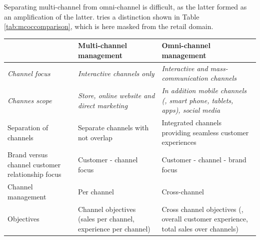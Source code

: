 		Separating multi-channel from omni-channel is difficult, as the latter formed as an amplification of the latter. \citeauthor{vorhoef2015retail} tries a distinction shown in Table \ref{tab:mcoccomparison}, which is here masked from the retail domain. 
		
		\begin{table}[caption={Multi- and omni-channel comparison}, label={tab:mcoccomparison}]
			\centering
			\begin{tabular}{p{3cm}| p{5cm} |p{5cm}} 
				& \textbf{Multi-channel management}                                   & \textbf{Omni-channel management}                                                              \\ \hline
				\textit{Channel focus}                         & \textit{Interactive channels only}                                    & \textit{Interactive and mass-communication channels}                                                   \\ \hline
				\textit{Channes scope}                                 & \textit{Store, online website and direct marketing}                          & \textit{In addition mobile channels (\ie, smart phone, tablets, apps), social media}                   \\ \hline
				{Separation of channels}                           & Separate channels with not overlap                                  & Integrated channels providing seamless customer experiences                                   \\ \hline
				{Brand versus channel customer relationship focus} & Customer - channel focus                                            & Customer - channel - brand  focus                                                              \\ \hline
				{Channel management}                               & Per channel                                                         & Cross-channel                                                                                 \\ \hline
				{Objectives}                                       & Channel objectives (\ie sales per channel, experience per channel)& Cross channel objectives (\ie, overall customer experience, total sales over channels) \\
			\end{tabular}
		\end{table}

